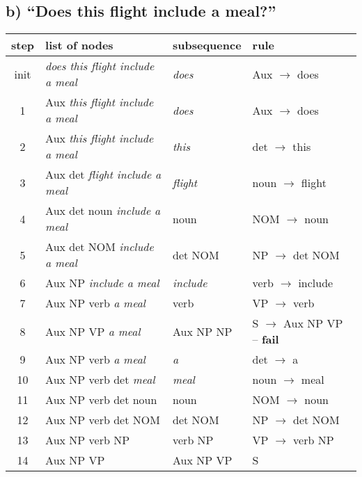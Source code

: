 \documentclass[a4paper]{article}
\newcommand{\ra}{$\rightarrow$ }
\newcommand{\f}{-- \textbf{fail}}
\begin{document}
\subsection*{b) ``Does this flight include a meal?''}
\begin{tabular}{| c | l | l | l |}
\hline 
\textbf{step} & \textbf{list of nodes} & \textbf{subsequence} & \textbf{rule}  \\ \hline
init & \textit{does this flight include a meal} & \textit{does} & Aux \ra does  \\
1 & Aux \textit{this flight include a meal} & \textit{does} & Aux \ra does  \\
2 & Aux \textit{this flight include a meal} & \textit{this} & det \ra this  \\
3 & Aux det \textit{flight include a meal} & \textit{flight} & noun \ra flight \\
4 & Aux det noun \textit{include a meal} & noun & NOM \ra noun \\
5 & Aux det NOM \textit{include a meal} & det NOM & NP \ra det NOM \\
6 & Aux NP \textit{include a meal} & \textit{include} & verb \ra include \\
7 & Aux NP verb \textit{a meal} & verb & VP \ra verb \\
8 & Aux NP VP \textit{a meal} & Aux NP NP & S \ra Aux NP VP \f \\
9 & Aux NP verb \textit{a meal} & \textit{a} & det \ra a \\
10 & Aux NP verb det \textit{meal} & \textit{meal} & noun \ra meal \\
11 & Aux NP verb det noun & noun & NOM \ra noun \\
12 & Aux NP verb det NOM & det NOM & NP \ra det NOM \\
13 & Aux NP verb NP & verb NP & VP \ra verb NP \\
14 & Aux NP VP & Aux NP VP & S  \\
\hline
\end{tabular}
\end{document}
